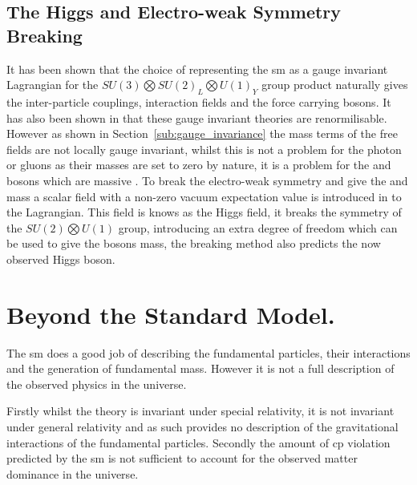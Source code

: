 \subsection{The Higgs and Electro-weak Symmetry Breaking} %
\label{sub:the_higgs_and_electro_weak_symmetry_breaking}
It has been shown that the choice of representing the \ac{sm} as a gauge 
invariant Lagrangian for the $SU(3)\bigotimes SU(2)_{L} \bigotimes U(1)_{Y}$ 
group product naturally gives the inter-particle couplings, interaction fields 
and the force carrying bosons. It has also been shown in \cite{Hooft1971167} 
that these gauge invariant theories are renormilisable. However as shown in 
Section~\ref{sub:gauge_invariance} the mass terms of the free fields are not 
locally gauge invariant, whilst this is not a problem for the photon or gluons 
as their masses are set to zero by nature, it is a problem for the \PW and \PZ 
bosons which are massive \cite{Arnison1983103,Aarnio1989539}. To break the 
electro-weak symmetry and give the \PW and \PZ mass a scalar field with a 
non-zero vacuum expectation value is introduced in to the 
Lagrangian\cite{Higgs:1966cl,Higgs:1964eu}. This field is knows as the Higgs 
field, it breaks the symmetry of the $SU(2)\bigotimes U(1)$ group, introducing 
an extra degree of freedom which can be used to give the bosons mass, the 
breaking method also predicts the now observed\cite{Chatrchyan201230,Aad20121} 
Higgs boson.



\section{Beyond the Standard Model.} %
\label{sec:beyond_the_standard_mode_}
The \ac{sm} does a good job of describing the fundamental particles, their 
interactions and the generation of fundamental mass. However it is not a full 
description of the observed physics in the universe.

Firstly whilst the theory is invariant under special relativity, it is not 
invariant under general relativity and as such provides no description of the 
gravitational interactions of the fundamental particles. 
Secondly the amount of \ac{cp} violation predicted by the \ac{sm} is not 
sufficient to account for the observed matter dominance in the universe.

